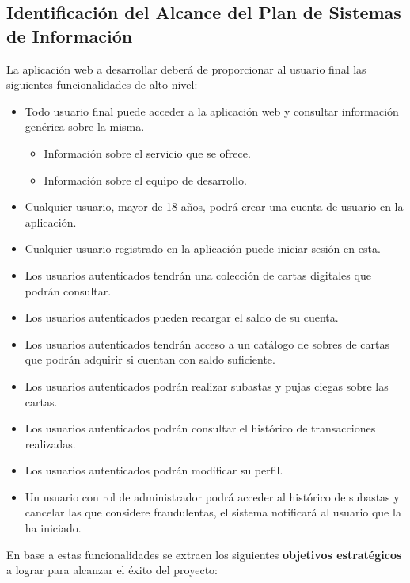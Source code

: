 \subsection{Identificación del Alcance del Plan de Sistemas de Información}  \label{sec:2_identificacion_alcance_PSI}
\hypertarget{sec:2_identificacion_alcance_PSI}{}
La aplicación web a desarrollar deberá de proporcionar al usuario final las siguientes funcionalidades de alto nivel:
\begin{itemize}
    \item Todo usuario final puede acceder a la aplicación web y consultar información genérica sobre la misma.
    \begin{itemize}
        \item Información sobre el servicio que se ofrece.
        \item Información sobre el equipo de desarrollo.
    \end{itemize}
    \item Cualquier usuario, mayor de 18 años, podrá crear una cuenta de usuario en la aplicación.
    \item Cualquier usuario registrado en la aplicación puede iniciar sesión en esta.
    \item Los usuarios autenticados tendrán una colección de cartas digitales que podrán consultar.
    \item Los usuarios autenticados pueden recargar el saldo de su cuenta.
    \item Los usuarios autenticados tendrán acceso a un catálogo de sobres de cartas que podrán adquirir si cuentan con saldo suficiente.
    \item Los usuarios autenticados podrán realizar subastas y pujas ciegas sobre las cartas.
    \item Los usuarios autenticados podrán consultar el histórico de transacciones realizadas.
    \item Los usuarios autenticados podrán modificar su perfil.
    \item Un usuario con rol de administrador podrá acceder al histórico de subastas y cancelar las que considere fraudulentas, el sistema notificará al usuario que la ha iniciado.
\end{itemize}

En base a estas funcionalidades se extraen los siguientes \textbf{objetivos estratégicos} a lograr para alcanzar el éxito del proyecto:

